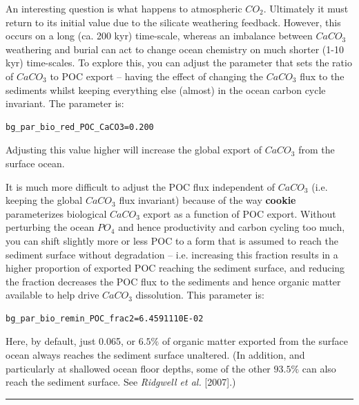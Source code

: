 An interesting question is what happens to atmospheric \(CO_{2}\). Ultimately it must return to its initial value due to the silicate weathering feedback. However, this occurs on a long (ca. 200 kyr) time-scale, whereas an imbalance between \(CaCO_{3}\) weathering and burial can act to change ocean chemistry on much shorter (1-10 kyr) time-scales. To explore this, you can adjust the parameter that sets the ratio of \(CaCO_{3}\) to POC export -- having the effect of changing the \(CaCO_{3}\) flux to the sediments whilst keeping everything else (almost) in the ocean carbon cycle invariant. The parameter is:
\vspace{-1mm}\small\begin{verbatim}
bg_par_bio_red_POC_CaCO3=0.200
\end{verbatim}\normalsize\vspace{-1mm}
Adjusting this value higher will increase the global export of \(CaCO_{3}\) from the surface ocean.

It is much more difficult to adjust the POC flux independent of \(CaCO_{3}\) (i.e. keeping the global \(CaCO_{3}\) flux invariant) because of the way \textbf{cookie} parameterizes biological \(CaCO_{3}\) export as a function of POC export. Without perturbing the ocean \(PO_{4}\) and hence productivity and carbon cycling too much, you can shift slightly more or less POC to a form that is assumed to reach the sediment surface without degradation -- i.e. increasing this fraction results in a higher proportion of exported POC reaching the sediment surface, and reducing the fraction decreases the POC flux to the sediments and hence organic matter available to help drive \(CaCO_{3}\) dissolution. This parameter is:
\vspace{-1mm}\small\begin{verbatim}
bg_par_bio_remin_POC_frac2=6.4591110E-02
\end{verbatim}\normalsize\vspace{-1mm}
Here, by default, just 0.065, or \(6.5\%\) of organic matter exported from the surface ocean always reaches the sediment surface unaltered. (In addition, and particularly at shallowed ocean floor depths, some of the other \(93.5\%\) can also reach the sediment surface. See \textit{Ridgwell et al.} [2007].)

\vspace{1mm}\noindent\rule{4cm}{0.1mm}\vspace{2mm}


